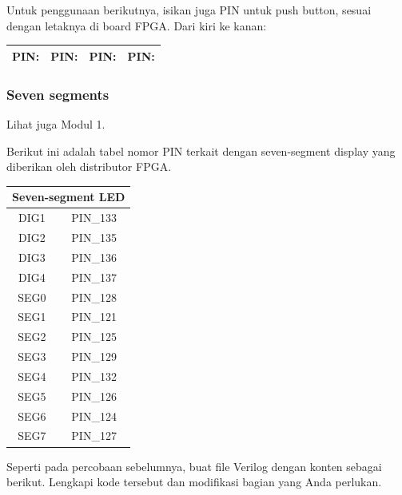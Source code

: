 Untuk penggunaan berikutnya, isikan juga PIN untuk push button,
sesuai dengan letaknya di board FPGA. Dari kiri ke kanan:

\begin{table}[H]
{\centering
\begin{tabular}{|c|c|c|c|}
\hline
PIN: \hspace{2cm} & PIN: \hspace{2cm} & PIN: \hspace{2cm} & PIN: \hspace{2cm} \\
\hline
\end{tabular}
\par}
\end{table}


\subsubsection{Seven segments}

Lihat juga Modul 1.

Berikut ini adalah tabel nomor PIN terkait dengan seven-segment display
yang diberikan oleh distributor FPGA.

\begin{table}[H]
\centering
\begin{tabular}{|c|c|}
\hline 
\multicolumn{2}{|c|}{Seven-segment LED} \\
\hline 
DIG1 & PIN\_133 \\
\hline 
DIG2 & PIN\_135 \\
\hline 
DIG3 & PIN\_136 \\
\hline 
DIG4 & PIN\_137 \\
\hline 
SEG0 & PIN\_128 \\
\hline 
SEG1 & PIN\_121 \\
\hline 
SEG2 & PIN\_125 \\
\hline
SEG3 & PIN\_129 \\
\hline
SEG4 & PIN\_132 \\
\hline
SEG5 & PIN\_126 \\
\hline
SEG6 & PIN\_124 \\
\hline
SEG7 & PIN\_127 \\
\hline 
\end{tabular}
\par
\end{table}

Seperti pada percobaan sebelumnya, buat file Verilog dengan konten sebagai berikut.
Lengkapi kode tersebut dan modifikasi bagian yang Anda perlukan.

